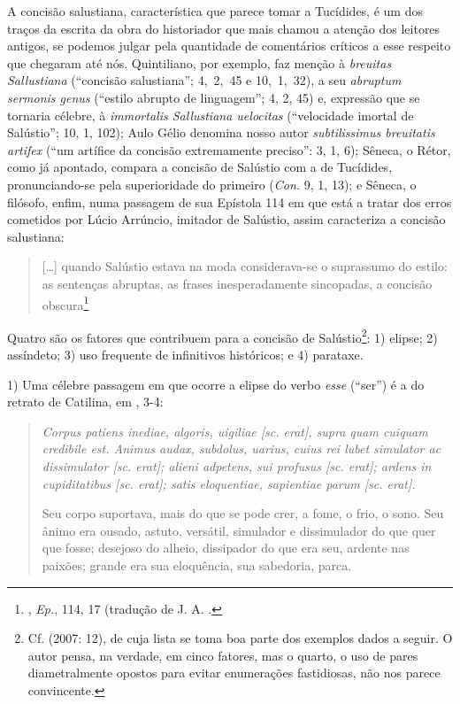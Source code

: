 A concisão salustiana, característica que parece tomar a Tucídides, é um dos
traços da escrita da obra do historiador que mais chamou a atenção dos leitores
antigos, se podemos julgar pela quantidade de comentários críticos a esse
respeito que chegaram até nós. Quintiliano, por exemplo, faz menção à
\emph{breuitas Sallustiana} (“concisão salustiana”; 4,~2,~45 e 10,~1,~32), a  seu \emph{abruptum sermonis genus }(“estilo abrupto de linguagem”; 4, 2, 45) e,
expressão que se tornaria célebre, à \emph{immortalis Sallustiana uelocitas}
(“velocidade imortal de Salústio”; 10, 1, 102); Aulo Gélio denomina nosso autor
\emph{subtilissimus breuitatis artifex} (“um artífice da concisão extremamente
preciso”: 3, 1, 6); Sêneca, o Rétor, como já apontado, compara a concisão de
Salústio com a de Tucídides, pronunciando-se pela superioridade do primeiro
(\emph{Con.} 9, 1, 13); e Sêneca, o filósofo, enfim, numa passagem de sua
Epístola 114 em que está a tratar dos erros cometidos por Lúcio Arrúncio,
imitador de Salústio, assim caracteriza a concisão salustiana: \begin{quote}
  [\ldots{}] quando Salústio estava na moda considerava-se o suprassumo do estilo:
  as sentenças abruptas, as frases inesperadamente sincopadas, a concisão
  obscura\footnote{ , \emph{Ep.}, 114, 17
(tradução de J. A.  .}  \end{quote} Quatro são os fatores que contribuem para a concisão de
Salústio\footnote{Cf.  (2007: 12), de cuja lista se toma boa parte dos
exemplos dados a seguir. O autor  pensa, na verdade, em cinco fatores, mas o
quarto, o uso de pares diametralmente opostos para evitar enumerações
fastidiosas, não nos parece convincente.}: 1) elipse; 2) assíndeto; 3) uso
frequente de infinitivos históricos; e 4) parataxe.  


1) Uma célebre passagem em
que ocorre a elipse do verbo \emph{esse} (“ser”) é a do retrato de Catilina, em ,
3-4: \begin{quote} \emph{Corpus patiens inediae, algoris, uigiliae [sc. erat],
  supra quam cuiquam credibile est. Animus audax, subdolus, uarius, cuius rei
lubet simulator ac dissimulator [sc. erat]; alieni adpetens, sui profusus [sc.
erat]; ardens in cupiditatibus [sc. erat]; satis eloquentiae, sapientiae parum
[sc. erat].}

Seu corpo suportava, mais do que se pode crer, a fome, o frio, o sono. Seu
ânimo era ousado, astuto, versátil, simulador e dissimulador do que quer que
fosse; desejoso do alheio, dissipador do que era seu, ardente nas paixões;
grande era sua eloquência, sua sabedoria, parca.  \end{quote}

